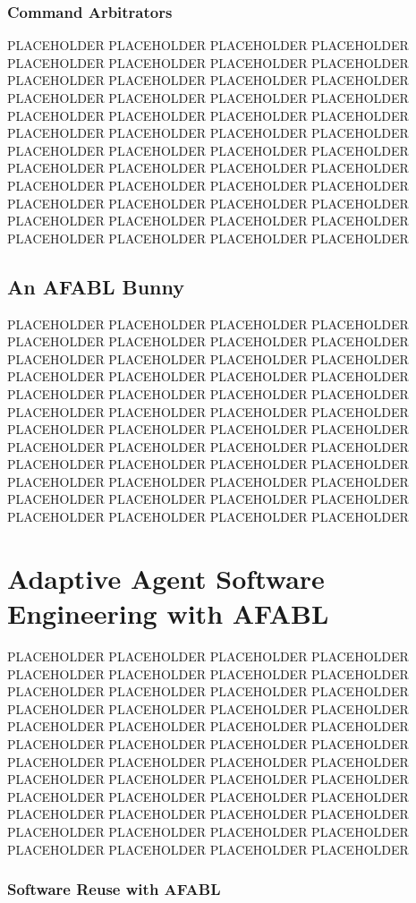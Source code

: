 \subsubsection{Command Arbitrators}

PLACEHOLDER PLACEHOLDER PLACEHOLDER PLACEHOLDER PLACEHOLDER PLACEHOLDER PLACEHOLDER PLACEHOLDER PLACEHOLDER PLACEHOLDER PLACEHOLDER PLACEHOLDER PLACEHOLDER PLACEHOLDER PLACEHOLDER PLACEHOLDER PLACEHOLDER PLACEHOLDER PLACEHOLDER PLACEHOLDER PLACEHOLDER PLACEHOLDER PLACEHOLDER PLACEHOLDER PLACEHOLDER PLACEHOLDER PLACEHOLDER PLACEHOLDER PLACEHOLDER PLACEHOLDER PLACEHOLDER PLACEHOLDER PLACEHOLDER PLACEHOLDER PLACEHOLDER PLACEHOLDER PLACEHOLDER PLACEHOLDER PLACEHOLDER PLACEHOLDER PLACEHOLDER PLACEHOLDER PLACEHOLDER PLACEHOLDER PLACEHOLDER PLACEHOLDER PLACEHOLDER PLACEHOLDER

\subsection{An AFABL Bunny}

PLACEHOLDER PLACEHOLDER PLACEHOLDER PLACEHOLDER PLACEHOLDER PLACEHOLDER PLACEHOLDER PLACEHOLDER PLACEHOLDER PLACEHOLDER PLACEHOLDER PLACEHOLDER PLACEHOLDER PLACEHOLDER PLACEHOLDER PLACEHOLDER PLACEHOLDER PLACEHOLDER PLACEHOLDER PLACEHOLDER PLACEHOLDER PLACEHOLDER PLACEHOLDER PLACEHOLDER PLACEHOLDER PLACEHOLDER PLACEHOLDER PLACEHOLDER PLACEHOLDER PLACEHOLDER PLACEHOLDER PLACEHOLDER PLACEHOLDER PLACEHOLDER PLACEHOLDER PLACEHOLDER PLACEHOLDER PLACEHOLDER PLACEHOLDER PLACEHOLDER PLACEHOLDER PLACEHOLDER PLACEHOLDER PLACEHOLDER PLACEHOLDER PLACEHOLDER PLACEHOLDER PLACEHOLDER


\section{Adaptive Agent Software Engineering with AFABL}

PLACEHOLDER PLACEHOLDER PLACEHOLDER PLACEHOLDER PLACEHOLDER PLACEHOLDER PLACEHOLDER PLACEHOLDER PLACEHOLDER PLACEHOLDER PLACEHOLDER PLACEHOLDER PLACEHOLDER PLACEHOLDER PLACEHOLDER PLACEHOLDER PLACEHOLDER PLACEHOLDER PLACEHOLDER PLACEHOLDER PLACEHOLDER PLACEHOLDER PLACEHOLDER PLACEHOLDER PLACEHOLDER PLACEHOLDER PLACEHOLDER PLACEHOLDER PLACEHOLDER PLACEHOLDER PLACEHOLDER PLACEHOLDER PLACEHOLDER PLACEHOLDER PLACEHOLDER PLACEHOLDER PLACEHOLDER PLACEHOLDER PLACEHOLDER PLACEHOLDER PLACEHOLDER PLACEHOLDER PLACEHOLDER PLACEHOLDER PLACEHOLDER PLACEHOLDER PLACEHOLDER PLACEHOLDER


\subsubsection{Software Reuse with AFABL}

